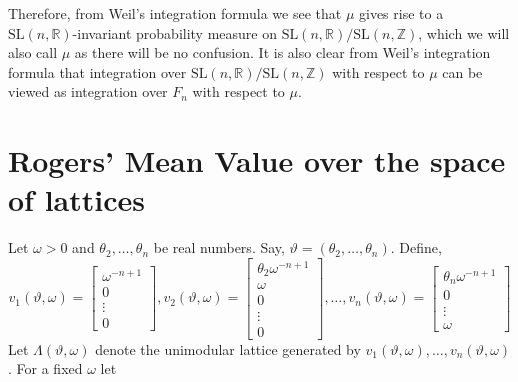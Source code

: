 \documentclass[11pt]{article}
\theoremstyle{definition}
\theoremstyle{proof}
\begin{document}
Therefore, from Weil's integration formula we see that $\mu$ gives rise to a $\mathrm{SL}(n,\mathbb{R})$-invariant probability measure on $\mathrm{SL}(n,\mathbb{R})/\mathrm{SL}(n,\mathbb{Z})$, which we will also call $\mu$ as there will be no confusion.
It is also clear from Weil's integration formula that integration over $\mathrm{SL}(n,\mathbb{R})/\mathrm{SL}(n,\mathbb{Z})$ with respect to $\mu$ can be viewed as integration over $F_n$ with respect to $\mu$.

\section{Rogers' Mean Value over the space of lattices}
Let $\omega > 0$ and $\theta _2, \ldots, \theta _n$ be real numbers.
Say, $\vartheta = (\theta _2, \ldots, \theta _n)$.
Define,
\[
    v_1(\vartheta , \omega ) = 
    \begin{bmatrix}
        \omega ^{-n+1} \\
        0 \\
        \vdots \\
        0
    \end{bmatrix}
    ,
    v_2(\vartheta , \omega ) = 
    \begin{bmatrix}
        \theta _2 \omega ^{-n+1} \\
        \omega  \\
        0 \\
        \vdots \\
        0
    \end{bmatrix}
    , \ldots,
    v_n(\vartheta , \omega ) = 
    \begin{bmatrix}
        \theta _n \omega ^{-n+1} \\
        0 \\
        \vdots \\
        \omega 
    \end{bmatrix}
\]
Let $\Lambda (\vartheta , \omega )$ denote the unimodular lattice generated by $v_1(\vartheta , \omega ), \ldots , v_n(\vartheta , \omega )$.
For a fixed $\omega$ let
\end{document}
